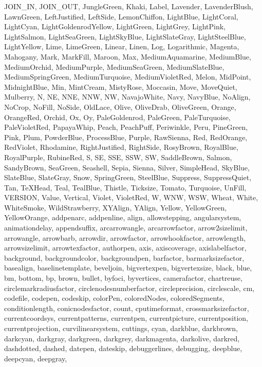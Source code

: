 {{  JOIN_IN, JOIN_OUT, JungleGreen, Khaki, Label, Lavender, LavenderBlush,
  LawnGreen, LeftJustified, LeftSide, LemonChiffon, LightBlue, LightCoral,
  LightCyan, LightGoldenrodYellow, LightGreen, LightGrey, LightPink,
  LightSalmon, LightSeaGreen, LightSkyBlue, LightSlateGray, LightSteelBlue,
  LightYellow, Lime, LimeGreen, Linear, Linen, Log, Logarithmic, Magenta,
  Mahogany, Mark, MarkFill, Maroon, Max, MediumAquamarine, MediumBlue,
  MediumOrchid, MediumPurple, MediumSeaGreen, MediumSlateBlue,
  MediumSpringGreen, MediumTurquoise, MediumVioletRed, Melon, MidPoint,
  MidnightBlue, Min, MintCream, MistyRose, Moccasin, Move, MoveQuiet,
  Mulberry, N, NE, NNE, NNW, NW, NavajoWhite, Navy, NavyBlue, NoAlign,
  NoCrop, NoFill, NoSide, OldLace, Olive, OliveDrab, OliveGreen, Orange,
  OrangeRed, Orchid, Ox, Oy, PaleGoldenrod, PaleGreen, PaleTurquoise,
  PaleVioletRed, PapayaWhip, Peach, PeachPuff, Periwinkle, Peru, PineGreen,
  Pink, Plum, PowderBlue, ProcessBlue, Purple, RawSienna, Red, RedOrange,
  RedViolet, Rhodamine, RightJustified, RightSide, RosyBrown, RoyalBlue,
  RoyalPurple, RubineRed, S, SE, SSE, SSW, SW, SaddleBrown, Salmon,
  SandyBrown, SeaGreen, Seashell, Sepia, Sienna, Silver, SimpleHead, SkyBlue,
  SlateBlue, SlateGray, Snow, SpringGreen, SteelBlue, Suppress,
  SuppressQuiet, Tan, TeXHead, Teal, TealBlue, Thistle, Ticksize, Tomato,
  Turquoise, UnFill, VERSION, Value, Vertical, Violet, VioletRed, W, WNW,
  WSW, Wheat, White, WhiteSmoke, WildStrawberry, XYAlign, YAlign, Yellow,
  YellowGreen, YellowOrange, addpenarc, addpenline, align, allowstepping,
  angularsystem, animationdelay, appendsuffix, arcarrowangle, arcarrowfactor,
  arrow2sizelimit, arrowangle, arrowbarb, arrowdir, arrowfactor,
  arrowhookfactor, arrowlength, arrowsizelimit, arrowtexfactor, authorpen,
  axis, axiscoverage, axislabelfactor, background, backgroundcolor,
  backgroundpen, barfactor, barmarksizefactor, basealign, baselinetemplate,
  beveljoin, bigvertexpen, bigvertexsize, black, blue, bm, bottom, bp, brown,
  bullet, byfoci, byvertices, camerafactor, chartreuse,
  circlemarkradiusfactor, circlenodesnumberfactor, circleprecision,
  circlescale, cm, codefile, codepen, codeskip, colorPen, coloredNodes,
  coloredSegments, conditionlength, conicnodesfactor, count, cputimeformat,
  crossmarksizefactor, currentcoordsys, currentpatterns, currentpen,
  currentpicture, currentposition, currentprojection, curvilinearsystem,
  cuttings, cyan, darkblue, darkbrown, darkcyan, darkgray, darkgreen,
  darkgrey, darkmagenta, darkolive, darkred, dashdotted, dashed, datepen,
  dateskip, debuggerlines, debugging, deepblue, deepcyan, deepgray,
}}
